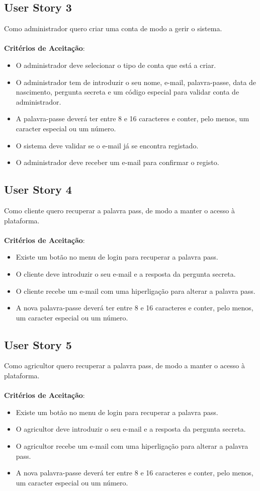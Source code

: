 \documentclass[a4paper,11pt]{article}
\begin{document}
\subsection{User Story 3}
Como administrador quero criar uma conta de modo a gerir o sistema.\\\\
\textbf{Critérios de Aceitação}:
\begin{itemize}
  \item O administrador deve selecionar o tipo de conta que está a criar.
  \item O administrador tem de introduzir o seu nome, e-mail, palavra-passe, data de nascimento, pergunta secreta e um código especial para validar conta de administrador.
  \item A palavra-passe deverá ter entre 8 e 16 caracteres e conter, pelo menos, um caracter especial ou um número.
  \item O sistema deve validar se o e-mail já se encontra registado.
  \item O administrador deve receber um e-mail para confirmar o registo.
\end{itemize}
\subsection{User Story 4}
Como cliente quero recuperar a palavra pass, de modo a manter o acesso à plataforma.\\\\
\textbf{Critérios de Aceitação}:
\begin{itemize}
  \item Existe um botão no menu de login para recuperar a palavra pass.
  \item O cliente deve introduzir o seu e-mail e a resposta da pergunta secreta.
  \item O cliente recebe um e-mail com uma hiperligação para alterar a palavra pass.
  \item A nova palavra-passe deverá ter entre 8 e 16 caracteres e conter, pelo menos, um caracter especial ou um número.
\end{itemize}
\subsection{User Story 5}
Como agricultor quero recuperar a palavra pass, de modo a manter o acesso à plataforma.\\\\
\textbf{Critérios de Aceitação}:
\begin{itemize}
  \item Existe um botão no menu de login para recuperar a palavra pass.
  \item O agricultor deve introduzir o seu e-mail e a resposta da pergunta secreta.
  \item O agricultor recebe um e-mail com uma hiperligação para alterar a palavra pass.
  \item A nova palavra-passe deverá ter entre 8 e 16 caracteres e conter, pelo menos, um caracter especial ou um número.
\end{itemize}
\end{document}
